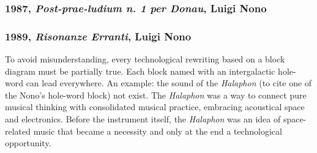 \subsubsection*{1987, \emph{Post-prae-ludium n. 1 per Donau}, Luigi Nono}
\subsubsection*{1989, \emph{Risonanze Erranti}, Luigi Nono}

To avoid misunderstanding, every technological rewriting based on a block diagram must be partially true. Each block named with an intergalactic hole-word can lead everywhere. An example: the sound of the \emph{Halaphon} (to cite one of the Nono's hole-word block) not exist. The \emph{Halaphon} was a way to connect pure musical thinking with consolidated musical practice, embracing acoustical space and electronics. Before the instrument itself, the \emph{Halaphon} was an idea of space-related music that became a necessity and only at the end a technological opportunity.



